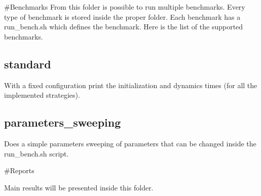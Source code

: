 \#\+Benchmarks From this folder is possible to run multiple benchmarks. Every type of benchmark is stored inside the proper folder. Each benchmark has a run\+\_\+bench.\+sh which defines the benchmark. Here is the list of the supported benchmarks.

\subsection*{standard}

With a fixed configuration print the initialization and dynamics times (for all the implemented strategies).

\subsection*{parameters\+\_\+sweeping}

Does a simple parameters sweeping of parameters that can be changed inside the run\+\_\+bench.\+sh script.

\#\+Reports

Main results will be presented inside this folder. 